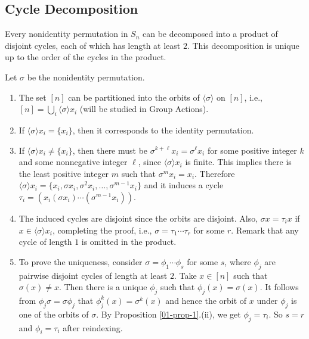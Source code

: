 \subsection{Cycle Decomposition}
\begin{theorem} \label{thm-cycle-decomposition}
	Every nonidentity permutation in $S_n$ can be decomposed into a product of disjoint cycles, each of which has length at least $2$. This decomposition is unique
	up to the order of the cycles in the product.
\end{theorem} 
\begin{sketch} Let $\sigma$ be the nonidentity permutation.
	\begin{enumerate}
		\item The set $[n]$ can be partitioned into the orbits of $\langle \sigma\rangle$ on $[n]$, i.e., $[n] = \bigcup_i \langle \sigma\rangle x_i$ (will be studied in Group Actions).
		\item If $\langle \sigma\rangle x_i = \{x_i\}$, then it corresponds to the identity permutation.
		\item If $\langle \sigma\rangle x_i \neq \{x_i\}$, then there must be $\sigma^{k+\ell} x_i = \sigma^{\ell} x_i$ for some positive integer $k$ and some nonnegative integer $\ell$, since $\langle\sigma\rangle x_i$ is finite. This implies there is the least positive integer  $m$ such that $\sigma^m x_i = x_i$. Therefore $\langle \sigma\rangle x_i = \{x_i,\sigma x_i, \sigma^2 x_i,\dots, \sigma^{m-1}x_i\}$ and it induces a cycle $\tau_i = (x_i(\sigma x_i)\cdots (\sigma^{m-1}x_i))$.
		\item  The induced cycles are disjoint since the orbits are disjoint. Also, $\sigma x = \tau_i x$ if $x\in \langle \sigma\rangle x_i$, completing the proof, i.e., $\sigma = \tau_1\cdots \tau_r$ for some $r$. Remark that any cycle of length $1$ is omitted in the product.
		\item To prove the uniqueness,  consider $\sigma  = \phi_1\cdots \phi_s$ for some $s$, where $\phi_j$ are pairwise disjoint cycles of length at least $2$. Take $x\in[n]$ such that $\sigma(x)\neq x$. Then there is a unique $\phi_j$ such that $\phi_j(x) = \sigma(x)$. It follows from $\phi_j\sigma  = \sigma\phi_j$ that $\phi^k_j(x) = \sigma^k(x)$ and hence the orbit of $x$ under $\phi_j$ is one of  the orbits of $\sigma$. By Proposition \ref{01-prop-1}.(ii), we get  $\phi_j = \tau_i$. So $s=r$ and $\phi_i =\tau_i$ after reindexing. \qedhere
	\end{enumerate}
\end{sketch}


